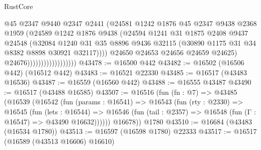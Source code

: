 \begin{lexlean}{RustCore}
\begin{coremodule}
                                        @45
                                        @2347
                                        @9440
                                        @2347
                                        @2441
                                        (@24581
                                          @1242
                                          @1876
                                          @45
                                          @2347
                                          @9438
                                          @2368
                                          @1959
                                          (@24589
                                            @1242
                                            @1876
                                            @9438
                                            (@24594
                                              @1241
                                              @31
                                              @1875
                                              @2408
                                              @9437
                                              @24548
                                              (@32084
                                                @1240
                                                @31
                                                @35
                                                @8896
                                                @9436
                                                @32115
                                                (@30890 @1175 @31 @34 @8382 @8898 @30921 @32117))))
                                          @24650
                                          @24653
                                          @24656
                                          @24659
                                          @24625)
                                        @24676))))))))))))))))))
@43478 := @16500 @442
@43482 := @16502 (@16506 @442) (@16512 @442)
@43483 := @16521 @22330
@43485 := @16517 (@43483 @16536)
@43487 := @16559 (@16560 @442)
@43488 := @16555 @43487
@43490 := @16517 (@43488 @16585)
@43507 := @16516
    (fun (fn : @7) =>
    @43485
      (@16539
        (@16542
          (fun (params : @16541) =>
          @16543
            (fun (rty : @2330) =>
            @16545
              (fun (lets : @16544) =>
              @16546 (fun (tail : @2357) => @16548 (fun (Γ : @16547) => @43490 @16632))))))
        @16678))
    @1780
@43510 := @16684 (@43483 (@16534 @1780))
@43513 := @16597 (@16598 @1780) @22333
@43517 := @16517 (@16589 (@43513 @16606) @16610)

\end{coremodule}
\end{lexlean}
